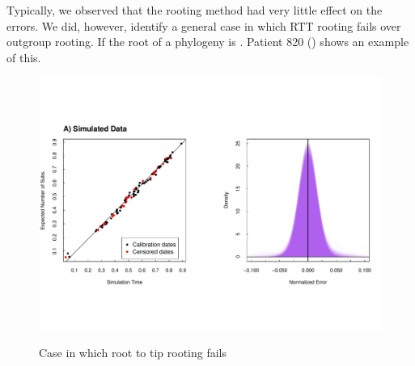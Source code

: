 Typically, we observed that the rooting method had very little effect on the errors. We did, however, identify a general case in which RTT rooting fails over outgroup rooting. If the root of a phylogeny is . 
Patient 820 () shows an example of this. 
\begin{figure}[!ht] \label{fig:degenerate_example}
	\centering
	\includegraphics[trim=0cm 4cm 0cm 6cm, clip=true, scale=0.425]{figures/simulated.pdf} \\
	\caption[Example of bad root]{ Case in which root to tip rooting fails}
\end{figure}

